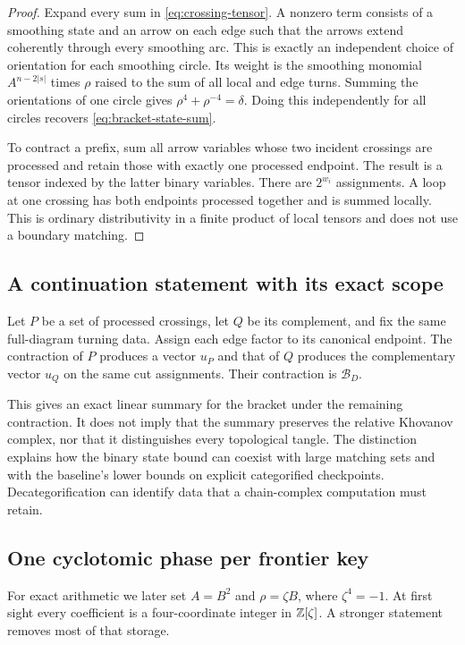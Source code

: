 \begin{proof}
Expand every sum in \eqref{eq:crossing-tensor}. A nonzero term consists of
a smoothing state and an arrow on each edge such that the arrows extend
coherently through every smoothing arc. This is exactly an independent
choice of orientation for each smoothing circle. Its weight is the
smoothing monomial $A^{n-2|s|}$ times $\rho$ raised to the sum of all local
and edge turns. Summing the orientations of one circle gives
$\rho^4+\rho^{-4}=\delta$. Doing this independently for all circles recovers
\eqref{eq:bracket-state-sum}.

To contract a prefix, sum all arrow variables whose two incident crossings
are processed and retain those with exactly one processed endpoint. The
result is a tensor indexed by the latter binary variables. There are
$2^{w_i}$ assignments. A loop at one crossing has both endpoints processed
together and is summed locally. This is ordinary distributivity in a
finite product of local tensors and does not use a boundary matching.
\end{proof}

\subsection{A continuation statement with its exact scope}

Let $P$ be a set of processed crossings, let $Q$ be its complement, and
fix the same full-diagram turning data. Assign each edge factor to its
canonical endpoint. The contraction of $P$ produces a vector $u_P$ and
that of $Q$ produces the complementary vector $u_Q$ on the same cut
assignments. Their contraction is $\mathcal B_D$.

This gives an exact linear summary for the bracket under the remaining
contraction. It does not imply that the summary preserves the relative
Khovanov complex, nor that it distinguishes every topological tangle.
The distinction explains how the binary state bound can coexist with
large matching sets and with the baseline's lower bounds on explicit
categorified checkpoints. Decategorification can identify data that a
chain-complex computation must retain.

\subsection{One cyclotomic phase per frontier key}

For exact arithmetic we later set $A=B^2$ and $\rho=\zeta B$, where
$\zeta^4=-1$. At first sight every coefficient is a four-coordinate
integer in $\mathbb Z[\zeta]$. A stronger statement removes most of that storage.

